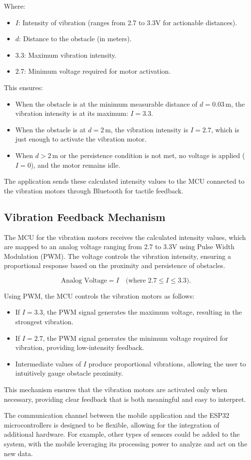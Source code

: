 Where:
\begin{itemize}
	\item \(I\): Intensity of vibration (ranges from 2.7 to 3.3V for actionable distances).
	\item \(d\): Distance to the obstacle (in meters).
	\item \(3.3\): Maximum vibration intensity.
	\item \(2.7\): Minimum voltage required for motor activation.
\end{itemize}

This ensures:
\begin{itemize}
	\item When the obstacle is at the minimum measurable distance of \(d = 0.03 \, \text{m}\), the vibration intensity is at its maximum: \(I = 3.3\).
	\item When the obstacle is at \(d = 2 \, \text{m}\), the vibration intensity is \(I = 2.7\), which is just enough to activate the vibration motor.
	\item When \(d > 2 \, \text{m}\) or the persistence condition is not met, no voltage is applied (\(I = 0\)), and the motor remains idle.
\end{itemize}

The application sends these calculated intensity values to the MCU connected to the vibration motors through Bluetooth for tactile feedback.

\subsection{Vibration Feedback Mechanism}

The MCU for the vibration motors receives the calculated intensity values, which are mapped to an analog voltage ranging from 2.7 to 3.3V using Pulse Width Modulation (PWM). The voltage controls the vibration intensity, ensuring a proportional response based on the proximity and persistence of obstacles.

\[
\text{Analog Voltage} = I \quad \text{(where \(2.7 \leq I \leq 3.3\))}.
\]

Using PWM, the MCU controls the vibration motors as follows:
\begin{itemize}
	\item If \(I = 3.3\), the PWM signal generates the maximum voltage, resulting in the strongest vibration.
	\item If \(I = 2.7\), the PWM signal generates the minimum voltage required for vibration, providing low-intensity feedback.
	\item Intermediate values of \(I\) produce proportional vibrations, allowing the user to intuitively gauge obstacle proximity.
\end{itemize}

This mechanism ensures that the vibration motors are activated only when necessary, providing clear feedback that is both meaningful and easy to interpret.

The communication channel between the mobile application and the ESP32 microcontrollers is designed to be flexible, allowing for the integration of additional hardware. For example, other types of sensors could be added to the system, with the mobile leveraging its processing power to analyze and act on the new data.
